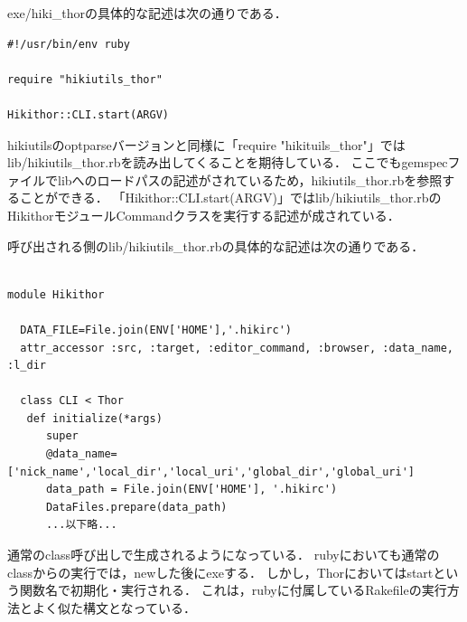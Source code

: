 exe/hiki\_thorの具体的な記述は次の通りである．
\begin{lstlisting}[style=customRuby,basicstyle={\scriptsize\ttfamily}]
#!/usr/bin/env ruby                                                             

require "hikiutils_thor"

Hikithor::CLI.start(ARGV)
\end{lstlisting}
hikiutilsのoptparseバージョンと同様に「require "hikituils\_thor"」ではlib/hikiutils\_thor.rbを読み出してくることを期待している．
ここでもgemspecファイルでlibへのロードパスの記述がされているため，hikiutils\_thor.rbを参照することができる．
「Hikithor::CLI.start(ARGV)」ではlib/hikiutils\_thor.rbのHikithorモジュールCommandクラスを実行する記述が成されている．

呼び出される側のlib/hikiutils\_thor.rbの具体的な記述は次の通りである．
\begin{lstlisting}[style=customRuby,basicstyle={\scriptsize\ttfamily}]

module Hikithor

  DATA_FILE=File.join(ENV['HOME'],'.hikirc')
  attr_accessor :src, :target, :editor_command, :browser, :data_name, :l_dir

  class CLI < Thor
   def initialize(*args)
      super
      @data_name=['nick_name','local_dir','local_uri','global_dir','global_uri']
      data_path = File.join(ENV['HOME'], '.hikirc')
      DataFiles.prepare(data_path)
      ...以下略...
\end{lstlisting}
通常のclass呼び出しで生成されるようになっている．
rubyにおいても通常のclassからの実行では，newした後にexeする．
しかし，Thorにおいてはstartという関数名で初期化・実行される．
これは，rubyに付属しているRakefileの実行方法とよく似た構文となっている．

